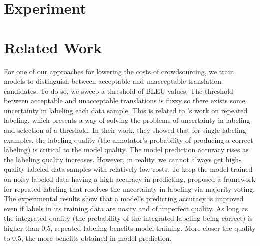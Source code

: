 \documentclass[11pt]{article}
\begin{document}
\section{Experiment}
\section{Related Work}

For one of our approaches for lowering the costs of crowdsourcing,  we train models to distinguish between acceptable and unacceptable translation candidates.  To do so,
we sweep a threshold of BLEU values. The threshold between acceptable and unacceptable translations is fuzzy so there exists some uncertainty in labeling each data sample.  This is related to \cite{sheng2008get}'s work on repeated labeling, which presents a way of solving the problems of   uncertainty in labeling and selection of a threshold. In their work, they showed that for single-labeling examples, the labeling quality (the annotator's probability of producing a correct labeling) is critical to the model quality. The model prediction accuracy rises as the labeling quality increases. However, in reality, we cannot always get high-quality labeled data samples with relatively low costs. To keep the model trained on noisy labeled data having a high accuracy in predicting,  proposed a framework for repeated-labeling that resolves the uncertainty in labeling via majority voting.  
The experimental results show that a model's predicting accuracy is improved even if labels in its training data are nosity and of imperfect quality.  As long as the integrated quality (the probability of the integrated labeling being correct) is higher than 0.5, repeated labeling benefits model training. More closer the quality to 0.5, the more benefits obtained in model prediction.


\end{document}
